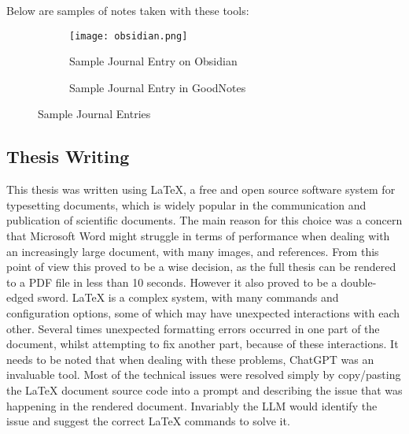 Below are samples of notes taken with these tools:


\begin{figure}[H]
  \centering
  \begin{subfigure}[b]{0.45\textwidth}
    \centering
    \texttt{[image: obsidian.png]}
    \caption[Sample Journal Entry in Obsidian]{Sample Journal Entry on Obsidian}
    \label{fig:obsidian}
  \end{subfigure}
  \hfill
  \begin{subfigure}[b]{0.45\textwidth}
    \centering
    \begingroup
    \setlength{\fboxsep}{0pt} %
    \setlength{\fboxrule}{0.5pt} %
    \endgroup
    \caption[Sample Journal Entry in GoodNotes]{Sample Journal Entry in GoodNotes}
    \label{fig:goodnotes}
  \end{subfigure}
  \caption{Sample Journal Entries}
  \label{fig:sample-journal}
\end{figure}



\subsection{Thesis Writing}

This thesis was written using LaTeX, a free and open source software system for typesetting documents, which is widely popular in the communication and publication of scientific documents. The main reason for this choice was a concern that Microsoft Word might struggle in terms of performance when dealing with an increasingly large document, with many images, and references. From this point of view this proved to be a wise decision, as the full thesis can be rendered to a PDF file in less than 10 seconds. However it also proved to be a double-edged sword. LaTeX is a complex system, with many commands and configuration options, some of which may have unexpected interactions with each other. Several times unexpected formatting errors occurred in one part of the document, whilst attempting to fix another part, because of these interactions.
It needs to be noted that when dealing with these problems, ChatGPT was an invaluable tool. Most of the technical issues were resolved simply by copy/pasting the LaTeX document source code into a prompt and describing the issue that was happening in the rendered document. Invariably the LLM would identify the issue and suggest the correct LaTeX commands to solve it.

